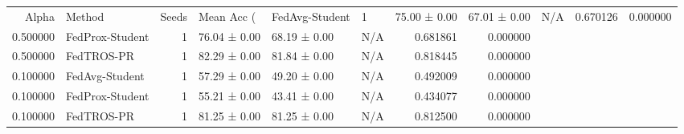 \begin{tabular}{rlrlllrr}
\toprule
Alpha & Method & Seeds & Mean Acc (%
 & FedAvg-Student & 1 & 75.00 ± 0.00 & 67.01 ± 0.00 & N/A & 0.670126 & 0.000000 \\
0.500000 & FedProx-Student & 1 & 76.04 ± 0.00 & 68.19 ± 0.00 & N/A & 0.681861 & 0.000000 \\
0.500000 & FedTROS-PR & 1 & 82.29 ± 0.00 & 81.84 ± 0.00 & N/A & 0.818445 & 0.000000 \\
0.100000 & FedAvg-Student & 1 & 57.29 ± 0.00 & 49.20 ± 0.00 & N/A & 0.492009 & 0.000000 \\
0.100000 & FedProx-Student & 1 & 55.21 ± 0.00 & 43.41 ± 0.00 & N/A & 0.434077 & 0.000000 \\
0.100000 & FedTROS-PR & 1 & 81.25 ± 0.00 & 81.25 ± 0.00 & N/A & 0.812500 & 0.000000 \\
\bottomrule
\end{tabular}
